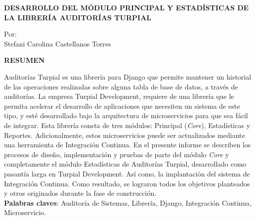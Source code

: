 \begin{center}
    \vspace{2cm}
    \textbf{
    DESARROLLO DEL MÓDULO PRINCIPAL Y ESTADÍSTICAS DE LA LIBRERÍA AUDITORÍAS TURPIAL
    }

    \vspace{2cm}

    Por:\\
    Stefani Carolina Castellanos Torres

    \vspace{2cm}

    \textbf{RESUMEN}\\

    \vspace{2cm}

\end{center}

Auditorías Turpial es una librería para Django que permite mantener un historial de las operaciones realizadas sobre alguna tabla de base de datos, a través de auditorías. La empresa Turpial Development, requiere de una librería que le permita acelerar el desarrollo de aplicaciones que necesiten un sistema de este tipo, y esté desarrollado bajo la arquitectura de microservicios para que sea fácil de integrar. Esta librería consta de tres módulos: Principal (\textit{Core}), Estadísticas y Reportes. Adicionalmente, estos microservicios puede ser actualizados mediante una herramienta de Integración Continua. En el presente informe se describen los procesos de diseño, implementación y pruebas de parte del módulo \textit{Core} y completamente el módulo Estadísticas de Auditorías Turpial, desarrollado como pasantía larga en Turpial Development. Así como, la implantación del sistema de Integración Continua. Como resultado, se lograron todos los objetivos planteados y otros originados durante la fase de construcción. \\

    \textbf{Palabras claves}: Auditoría de Sistemas, Librería, Django, Integración Continua, Microservicio.
